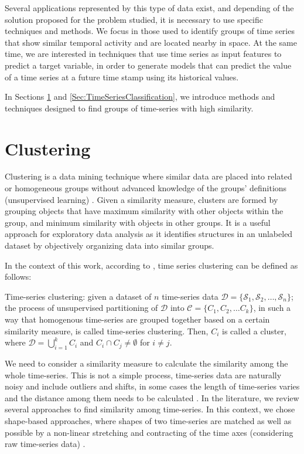 Several applications represented by this type of data exist, and depending of the solution proposed for the problem studied, it is necessary to use specific techniques and methods. We focus in those used to identify groups of time series that show similar temporal activity and are located nearby in space. At the same time, we are interested in techniques that use time series as input features to predict a target variable, in order to generate models that can predict the value of a time series at a future time stamp using its historical values.

In Sections \ref{Sec:TimeSeriesClustering} and \ref{Sec:TimeSeriesClassification}, we introduce methods and techniques designed to find groups of time-series with high similarity. 

\section{Clustering}
\label{Sec:TimeSeriesClustering}

Clustering is a data mining technique where similar data are placed into related or homogeneous groups without advanced knowledge of the groups' definitions (unsupervised learning) \cite{HastieTF2009}. Given a similarity measure, clusters are formed by grouping objects that have maximum similarity with other objects within the group, and minimum similarity with objects in other groups. It is a useful approach for exploratory data analysis as it identifies structures in an unlabeled dataset by objectively organizing data into similar groups.

In the context of this work, according to \cite{Aghabozorgi2015}, time series clustering can be defined as follows:

\begin{definition} Time-series clustering: given a dataset of $n$ time-series data $\mathcal{D} = \{\mathcal{S}_1, \mathcal{S}_2, \ldots, \mathcal{S}_n\}$; the process of unsupervised partitioning of $\mathcal{D}$ into $\mathcal{C} = \{C_1, C_2, \ldots C_k\}$, in such a way
that homogenous time-series are grouped together based on a certain similarity measure, is called time-series clustering. Then, $C_i$ is called a cluster, where $\mathcal{D} = \bigcup_{i=1}^{k} C_{i}$ and $C_i \cap C_j \neq \emptyset$ for $i \neq j$.
\end{definition}

We need to consider a similarity measure to calculate the similarity among the whole time-series. This is not a simple process, time-series data are naturally noisy and include outliers and shifts, in some cases the length of time-series varies and the distance among them needs to be calculated \cite{Liao2005}. In the literature, we review several approaches to find similarity among time-series. In this context, we chose shape-based approaches, where shapes of two time-series are matched as well as possible by a non-linear stretching and contracting of the time axes (considering raw time-series data) \cite{Meesrikamolkul2012}.

